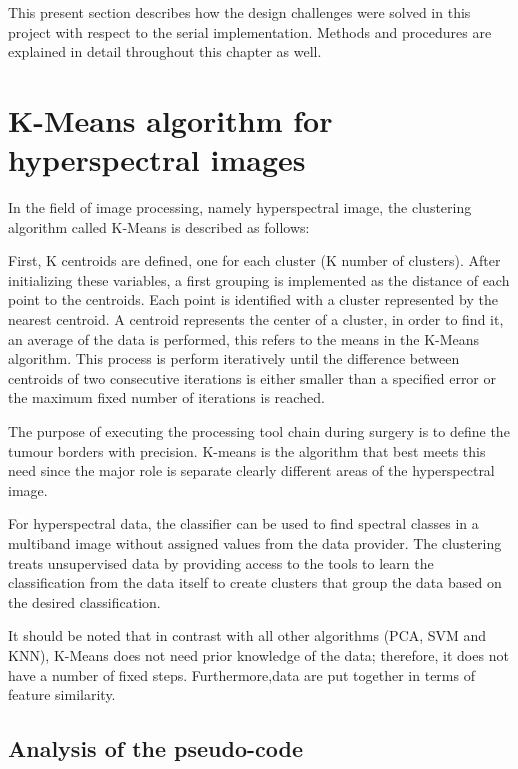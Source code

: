 This present section describes how the design challenges were solved in this project with respect to the serial implementation. Methods and procedures are explained in detail throughout this chapter as well.

    \section{K-Means algorithm for hyperspectral images}
    
    
    In the field of image processing, namely hyperspectral image, the clustering algorithm called K-Means is described as follows:
    
     First, K centroids are defined, one for each cluster (K number of clusters). After initializing these variables, a first grouping is implemented as the distance of each point to the centroids. Each point is identified with a cluster represented by the nearest centroid. A centroid represents the center of a cluster, in order to find it, an average of the data is performed, this refers to the means in the K-Means algorithm. This process is perform iteratively until the difference between centroids of two consecutive iterations is either smaller than a specified error or the maximum fixed number of iterations is reached. 
    
    
    The purpose of executing the processing tool chain during surgery is to define the tumour borders with precision. K-means is the algorithm that best meets this need since the major role is separate clearly different areas of the hyperspectral image. 
    
 For hyperspectral data, the classifier can be used to find spectral classes in a multiband image without assigned values from the data provider. The clustering treats unsupervised data by providing access to the tools to learn the classification from the data itself to create clusters that group the data based on the desired classification\cite{kushi2012american}.
  
 	It should be noted that in contrast with all other algorithms (PCA, SVM and KNN), K-Means does not need prior knowledge of the data; therefore, it does not have a number of fixed steps. Furthermore,data are put together in terms of feature similarity. 
 	
 
 
    \subsection{Analysis of the pseudo-code}
    
